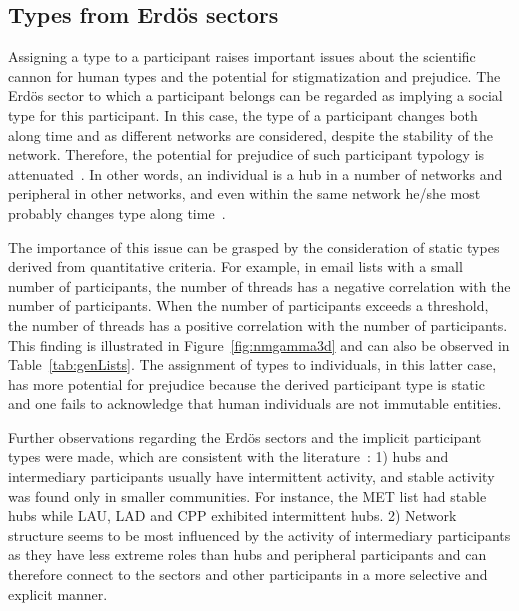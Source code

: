 																							\subsection{Types from Erd\"os sectors}\label{sec:pty}


																							Assigning a type to a participant raises important issues about the scientific cannon for human types and the potential for stigmatization and prejudice. The Erd\"os sector to which a participant belongs can be regarded as implying a social type for this participant.
																							In this case, the type of a participant changes both along time and as different networks are considered, despite the stability of the network. Therefore, the potential for prejudice of such participant typology is attenuated~\cite{adorno}. In other words, an individual is a hub in a number of networks and peripheral in other networks, and even within the same network he/she most probably changes type along time~\cite{animacoes}.

																							The importance of this issue can be grasped by the consideration of static types derived from quantitative criteria. For example, in email lists with a small number of participants, the number of threads has a negative correlation with the number of participants.
																							When the number of participants exceeds a threshold, the number of threads has a positive correlation with the number of participants.
																							This finding is illustrated in Figure~\ref{fig:nmgamma3d}
																							and can also be observed in Table~\ref{tab:genLists}.
																							The assignment of types to individuals, in this latter case,
																							has more potential for prejudice because
																							the derived participant type is static and
																							one fails to acknowledge that
																							human individuals are not immutable entities.

																							Further observations regarding the Erd\"os sectors
																							and the implicit participant types were made, which are consistent with the literature~\cite{barabasiEvo}: 1) hubs and intermediary participants usually have intermittent activity, and stable activity was found only in smaller communities. For instance, the MET list had stable hubs while LAU, LAD and CPP exhibited intermittent hubs.
																							2) Network structure seems to be most influenced by the
																							activity of intermediary participants as they have less extreme
																							roles than hubs and peripheral participants and
																							can therefore connect to the sectors and other participants 
																							in a more selective and explicit manner.




